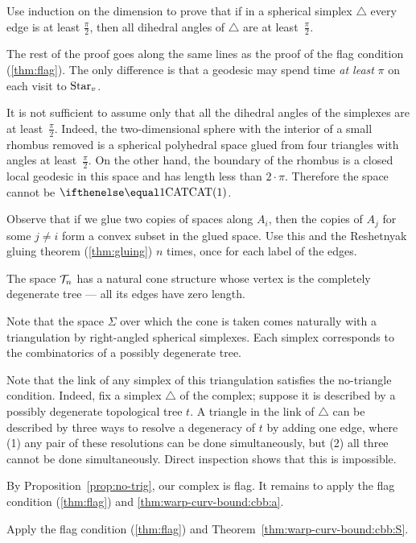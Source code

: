 Use induction on the dimension  to prove that if in a spherical simplex $\triangle$ every edge is at least $\tfrac\pi2$, then 
all dihedral angles of $\triangle$ are at least~$\tfrac\pi2$.

The rest of the proof goes along the same lines as the proof of the flag condition (\ref{thm:flag}).
The only difference is that a geodesic may spend time \textit{at least} $\pi$ on each visit to $\mathop{\rm Star}\nolimits_v$.

It is not sufficient to assume only that all the dihedral angles of the simplexes are at least~$\tfrac\pi2$. 
Indeed, the two-dimensional sphere with the interior of a small rhombus removed is a spherical polyhedral space glued from four triangles with angles at least~$\tfrac\pi2$.
On the other hand, the boundary of the rhombus is a closed local geodesic in this space and has length less than $2\cdot\pi$.
Therefore the space cannot be $\CAT1$.

Observe that if we glue two copies of spaces along $A_i$, then the copies of $A_j$ for some $j\ne i$ form a convex subset in the glued space.
Use this and the Reshetnyak gluing theorem (\ref{thm:gluing}) $n$ times, once for each label of the edges.

The space $\mathcal{T}_n$ has a natural cone structure whose vertex is the  completely degenerate tree --- all its edges have zero length.

Note that the space $\Sigma$
over which the cone is taken comes naturally with a triangulation 
by right-angled spherical simplexes.
Each simplex corresponds to the combinatorics of a possibly degenerate tree.

Note that the link of any simplex of this triangulation satisfies the no-triangle condition.
Indeed, fix a simplex $\triangle$ of the complex;
suppose it is described by a possibly degenerate topological tree $t$.
A triangle in the link of  $\triangle$ can be described by three ways to resolve a degeneracy of $t$ by adding one edge, where 
(1) any pair of these resolutions can be done simultaneously, but (2) all three cannot be done simultaneously.
Direct inspection shows that this is impossible.

By Proposition~\ref{prop:no-trig}, our complex is flag.
It remains to apply the flag condition (\ref{thm:flag}) and \ref{thm:warp-curv-bound:cbb:a}.

Apply the flag condition (\ref{thm:flag}) and Theorem~\ref{thm:warp-curv-bound:cbb:S}.


